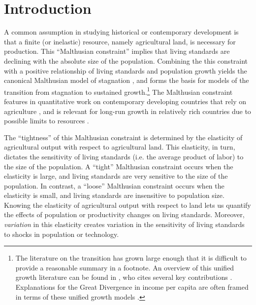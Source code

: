 \documentclass[11pt]{article}
\begin{document}
\pagebreak 

\section{Introduction}
\onehalfspacing 
A common assumption in studying historical or contemporary development is that a finite (or inelastic) resource, namely agricultural land, is necessary for production. This ``Malthusian constraint'' implies that living standards are declining with the absolute size of the population. Combining the this constraint with a positive relationship of living standards and population growth yields the canonical Malthusian model of stagnation \citep{ashraf2010dynamics}, and forms the basis for models of the transition from stagnation to sustained growth.\footnote{The literature on the transition has grown large enough that it is difficult to provide a reasonable summary in a footnote. An overview of this unified growth literature can be found in \citet{Galor:2011uq}, who cites several key contributions \citep{gw00,galor2002natural,Hansen:2002fk,doepke2004accounting,cs2005,lagerlof2006,craftsmills2009,strulik2008population}. Explanations for the Great Divergence in income per capita are often framed in terms of these unified growth models \citep{kp2001,galor2008trading,vollrath2011,vv08,vv13,cs2015}.} The Malthusian constraint features in quantitative work on contemporary developing countries that rely on agriculture \citep{Gollin:2007oq,Restuccia:2008hc,weilwilde2009,Gollin:2010ys,ev2016clim,ev2016}, and is relevant for long-run growth in relatively rich countries due to possible limits to resources \citep{perettovalente2015}.

The ``tightness'' of this Malthusian constraint is determined by the elasticity of agricultural output with respect to agricultural land. This elasticity, in turn, dictates the sensitivity of living standards (i.e. the average product of labor) to the size of the population. A ``tight'' Malthusian constraint occurs when the elasticity is large, and living standards are very sensitive to the size of the population. In contrast, a ``loose'' Malthusian constraint occurs when the elasticity is small, and living standards are insensitive to population size. Knowing the elasticity of agricultural output with respect to land lets us quantify the effects of population or productivity changes on living standards. Moreover, \textit{variation} in this elasticity creates variation in the sensitivity of living standards to shocks in population or technology.
\end{document}
